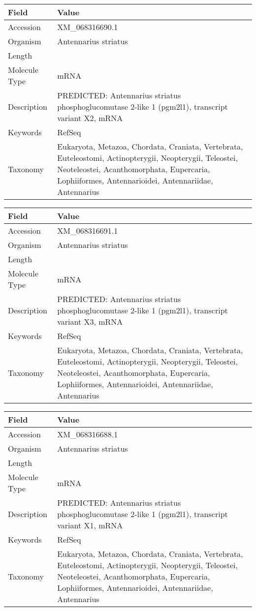 \documentclass[10pt]{article}
\begin{document}
\vspace{1em}
{\footnotesize
\begin{longtable}{>{\raggedright\arraybackslash}p{4.5cm} >{\raggedright\arraybackslash}p{11.5cm}}
\textbf{Field} & \textbf{Value} \\
\hline
Accession & XM\_068316690.1 \\
Organism & Antennarius striatus \\
Length & 2929 \\
Molecule Type & mRNA \\
Description & PREDICTED: Antennarius striatus phosphoglucomutase 2-like 1 (pgm2l1), transcript variant X2, mRNA \\
Keywords & RefSeq \\
Taxonomy & Eukaryota, Metazoa, Chordata, Craniata, Vertebrata, Euteleostomi, Actinopterygii, Neopterygii, Teleostei, Neoteleostei, Acanthomorphata, Eupercaria, Lophiiformes, Antennarioidei, Antennariidae, Antennarius \\
\end{longtable}
}

\vspace{1em}
{\footnotesize
\begin{longtable}{>{\raggedright\arraybackslash}p{4.5cm} >{\raggedright\arraybackslash}p{11.5cm}}
\textbf{Field} & \textbf{Value} \\
\hline
Accession & XM\_068316691.1 \\
Organism & Antennarius striatus \\
Length & 2761 \\
Molecule Type & mRNA \\
Description & PREDICTED: Antennarius striatus phosphoglucomutase 2-like 1 (pgm2l1), transcript variant X3, mRNA \\
Keywords & RefSeq \\
Taxonomy & Eukaryota, Metazoa, Chordata, Craniata, Vertebrata, Euteleostomi, Actinopterygii, Neopterygii, Teleostei, Neoteleostei, Acanthomorphata, Eupercaria, Lophiiformes, Antennarioidei, Antennariidae, Antennarius \\
\end{longtable}
}

\vspace{1em}
{\footnotesize
\begin{longtable}{>{\raggedright\arraybackslash}p{4.5cm} >{\raggedright\arraybackslash}p{11.5cm}}
\textbf{Field} & \textbf{Value} \\
\hline
Accession & XM\_068316688.1 \\
Organism & Antennarius striatus \\
Length & 3033 \\
Molecule Type & mRNA \\
Description & PREDICTED: Antennarius striatus phosphoglucomutase 2-like 1 (pgm2l1), transcript variant X1, mRNA \\
Keywords & RefSeq \\
Taxonomy & Eukaryota, Metazoa, Chordata, Craniata, Vertebrata, Euteleostomi, Actinopterygii, Neopterygii, Teleostei, Neoteleostei, Acanthomorphata, Eupercaria, Lophiiformes, Antennarioidei, Antennariidae, Antennarius \\
\end{longtable}
}
\end{document}

